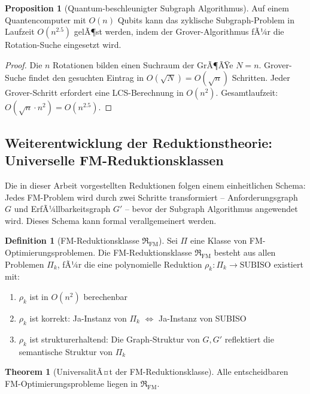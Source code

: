 ﻿\documentclass[a4paper,12pt]{article}
\theoremstyle{definition}
\newtheorem{definition}{Definition}[section]
\newtheorem{theorem}{Theorem}[section]
\newtheorem{proposition}{Proposition}[section]
\begin{document}
\begin{proposition}[Quantum-beschleunigter Subgraph Algorithmus]
\label{prop:quantum}
Auf einem Quantencomputer mit $O(n)$ Qubits kann das zyklische Subgraph-Problem
in Laufzeit $O(n^{2.5})$ gelÃ¶st werden, indem der Grover-Algorithmus fÃ¼r die
Rotation-Suche eingesetzt wird.
\end{proposition}

\begin{proof}
Die $n$ Rotationen bilden einen Suchraum der GrÃ¶ÃŸe $N = n$.
Grover-Suche findet den gesuchten Eintrag in $O(\sqrt{N}) = O(\sqrt{n})$ Schritten.
Jeder Grover-Schritt erfordert eine LCS-Berechnung in $O(n^2)$.
Gesamtlaufzeit: $O(\sqrt{n} \cdot n^2) = O(n^{2.5})$.
\end{proof}

\subsection{Weiterentwicklung der Reduktionstheorie: Universelle FM-Reduktionsklassen}

Die in dieser Arbeit vorgestellten Reduktionen folgen einem einheitlichen Schema:
Jedes FM-Problem wird durch zwei Schritte transformiert -- Anforderungsgraph $G$
und ErfÃ¼llbarkeitsgraph $G'$ -- bevor der Subgraph Algorithmus angewendet wird.
Dieses Schema kann formal verallgemeinert werden.

\begin{definition}[FM-Reduktionsklasse $\mathfrak{R}_{\mathrm{FM}}$]
\label{def:redklasse}
Sei $\Pi$ eine Klasse von FM-Optimierungspro\-blemen.
Die FM-Reduktionsklasse $\mathfrak{R}_{\mathrm{FM}}$ besteht aus allen Problemen
$\Pi_k$, fÃ¼r die eine polynomielle Reduktion
$\rho_k: \Pi_k \to \mathrm{SUBISO}$ existiert mit:
\begin{enumerate}
    \item $\rho_k$ ist in $O(n^2)$ berechenbar
    \item $\rho_k$ ist korrekt: Ja-Instanz von $\Pi_k$ $\Leftrightarrow$ Ja-Instanz von SUBISO
    \item $\rho_k$ ist strukturerhaltend: Die Graph-Struktur von $G, G'$
          reflektiert die semantische Struktur von $\Pi_k$
\end{enumerate}
\end{definition}

\begin{theorem}[UniversalitÃ¤t der FM-Reduktionsklasse]
\label{thm:universal}
Alle entscheidbaren FM-Opti\-mierungsprobleme liegen in $\mathfrak{R}_{\mathrm{FM}}$.
\end{theorem}
\end{document}
